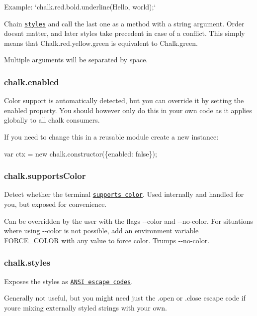 Example\+: `chalk.red.\+bold.\+underline(\textquotesingle{}Hello\textquotesingle{}, \textquotesingle{}world\textquotesingle{});`

Chain \href{#styles}{\tt styles} and call the last one as a method with a string argument. Order doesn\textquotesingle{}t matter, and later styles take precedent in case of a conflict. This simply means that {\ttfamily Chalk.\+red.\+yellow.\+green} is equivalent to {\ttfamily Chalk.\+green}.

Multiple arguments will be separated by space.

\subsubsection*{chalk.\+enabled}

Color support is automatically detected, but you can override it by setting the {\ttfamily enabled} property. You should however only do this in your own code as it applies globally to all chalk consumers.

If you need to change this in a reusable module create a new instance\+:


\begin{DoxyCode}
var ctx = new chalk.constructor(\{enabled: false\});
\end{DoxyCode}


\subsubsection*{chalk.\+supports\+Color}

Detect whether the terminal \href{https://github.com/chalk/supports-color}{\tt supports color}. Used internally and handled for you, but exposed for convenience.

Can be overridden by the user with the flags {\ttfamily -\/-\/color} and {\ttfamily -\/-\/no-\/color}. For situations where using {\ttfamily -\/-\/color} is not possible, add an environment variable {\ttfamily F\+O\+R\+C\+E\+\_\+\+C\+O\+L\+OR} with any value to force color. Trumps {\ttfamily -\/-\/no-\/color}.

\subsubsection*{chalk.\+styles}

Exposes the styles as \href{https://github.com/chalk/ansi-styles}{\tt A\+N\+SI escape codes}.

Generally not useful, but you might need just the {\ttfamily .open} or {\ttfamily .close} escape code if you\textquotesingle{}re mixing externally styled strings with your own.


